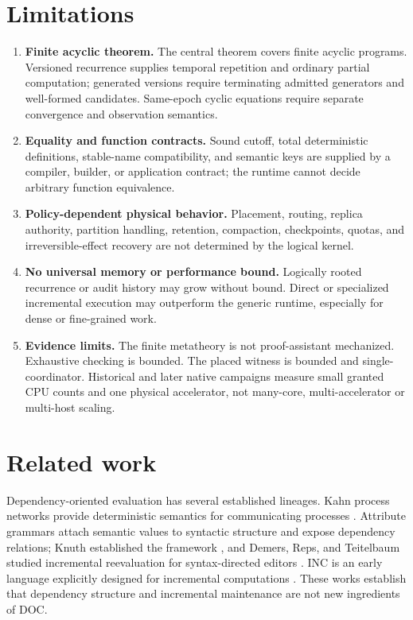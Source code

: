 \section{Limitations}\label{sec:limitations}
\begin{enumerate}[label=\arabic*.]
\item \textbf{Finite acyclic theorem.} The central theorem covers finite acyclic programs. Versioned recurrence supplies temporal repetition and ordinary partial computation; generated versions require terminating admitted generators and well-formed candidates. Same-epoch cyclic equations require separate convergence and observation semantics.
\item \textbf{Equality and function contracts.} Sound cutoff, total deterministic definitions, stable-name compatibility, and semantic keys are supplied by a compiler, builder, or application contract; the runtime cannot decide arbitrary function equivalence.
\item \textbf{Policy-dependent physical behavior.} Placement, routing, replica authority, partition handling, retention, compaction, checkpoints, quotas, and irreversible-effect recovery are not determined by the logical kernel.
\item \textbf{No universal memory or performance bound.} Logically rooted recurrence or audit history may grow without bound. Direct or specialized incremental execution may outperform the generic runtime, especially for dense or fine-grained work.
\item \textbf{Evidence limits.} The finite metatheory is not proof-assistant mechanized. Exhaustive checking is bounded. The placed witness is bounded and single-coordinator. Historical and later native campaigns measure small granted CPU counts and one physical accelerator, not many-core, multi-accelerator or multi-host scaling.
\end{enumerate}

\section{Related work}\label{sec:related}
Dependency-oriented evaluation has several established lineages. Kahn process networks provide deterministic semantics for communicating processes \cite{kahn1974}. Attribute grammars attach semantic values to syntactic structure and expose dependency relations; Knuth established the framework \cite{knuth1968,knuth1971correction}, and Demers, Reps, and Teitelbaum studied incremental reevaluation for syntax-directed editors \cite{demers1981}. INC is an early language explicitly designed for incremental computations \cite{yellin1991}. These works establish that dependency structure and incremental maintenance are not new ingredients of DOC.

